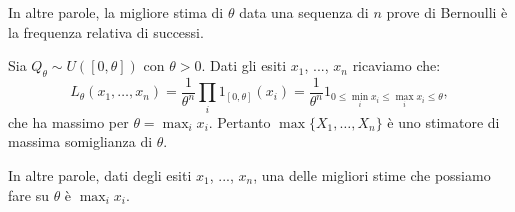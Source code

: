 \begin{multicols*}{2}
\begin{example}
    In altre parole, la migliore stima di $\theta$ data una sequenza di $n$ prove di Bernoulli è
    la frequenza relativa di successi.
\end{example}

\begin{example}
    Sia $Q_\theta \sim U([0, \theta])$ con $\theta > 0$. Dati gli esiti $x_1$, ..., $x_n$ ricaviamo che:
    \[
        L_\theta(x_1, \ldots, x_n) = \frac{1}{\theta^n} \prod_i 1_{[0, \theta]}(x_i) =
        \frac{1}{\theta^n} 1_{0 \leq \min_i x_i \leq \max_i x_i \leq \theta},
    \]
    che ha massimo per $\theta = \max_i x_i$. Pertanto $\max\{X_1, \ldots, X_n\}$ è uno stimatore
    di massima somiglianza di $\theta$. \smallskip

    In altre parole, dati degli esiti $x_1$, ..., $x_n$, una delle migliori stime che possiamo fare
    su $\theta$ è $\max_i x_i$.
\end{example}

\end{multicols*}
